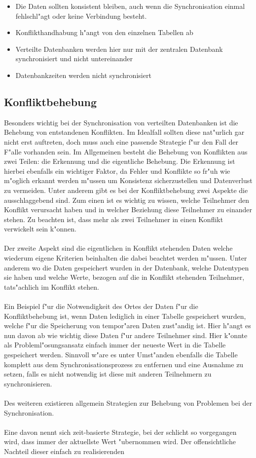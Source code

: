 \documentclass[a4paper,14pt]{scrreprt}
\begin{document}
\begin{itemize}
\item Die Daten sollten konsistent bleiben, auch wenn die Synchronisation einmal fehlschl"agt oder keine Verbindung besteht.
\item Konflikthandhabung h"angt von den einzelnen Tabellen ab
\item Verteilte Datenbanken werden hier nur mit der zentralen Datenbank synchronisiert und nicht untereinander
\item Datenbankzeiten werden nicht synchronisiert
\end{itemize}
\cite{diploBork}
\subsection{Konfliktbehebung}
Besonders wichtig bei der Synchronisation von verteilten Datenbanken ist die Behebung von entstandenen Konflikten. Im Idealfall sollten diese nat"urlich gar nicht erst auftreten, doch muss auch eine passende Strategie f"ur den Fall der F"alle vorhanden sein. Im Allgemeinen besteht die Behebung von Konflikten aus zwei Teilen: die Erkennung und die eigentliche Behebung. Die Erkennung ist hierbei ebenfalls ein wichtiger Faktor, da Fehler und Konflikte so fr"uh wie m"oglich erkannt werden m"ussen um Konsistenz sicherzustellen und Datenverlust zu vermeiden. Unter anderem gibt es bei der Konfliktbehebung zwei Aspekte die ausschlaggebend sind. Zum einen ist es wichtig zu wissen, welche Teilnehmer den Konflikt verursacht haben und in welcher Beziehung diese Teilnehmer zu einander stehen. Zu beachten ist, dass mehr als zwei Teilnehmer in einen Konflikt verwickelt sein k"onnen.\\\\Der zweite Aspekt sind die eigentlichen in Konflikt stehenden Daten welche wiederum eigene Kriterien beinhalten die dabei beachtet werden m"ussen. Unter anderem wo die Daten gespeichert wurden in der Datenbank, welche Datentypen sie haben und welche Werte, bezogen auf die in Konflikt stehenden Teilnehmer, tats"achlich im Konflikt stehen.\\\\Ein Beispiel f"ur die Notwendigkeit des Ortes der Daten f"ur die Konfliktbehebung ist, wenn Daten lediglich in einer Tabelle gespeichert wurden, welche f"ur die Speicherung von tempor"aren Daten zust"andig ist. Hier h"angt es nun davon ab wie wichtig diese Daten f"ur andere Teilnehmer sind. Hier k"onnte als Probleml"osungsansatz einfach immer der neueste Wert in die Tabelle gespeichert werden. Sinnvoll w"are es unter Umst"anden ebenfalls die Tabelle komplett aus dem Synchronisationsprozess zu entfernen und eine Ausnahme zu setzen, falls es nicht notwendig ist diese mit anderen Teilnehmern zu synchronisieren.\\\\Des weiteren existieren allgemein Strategien zur Behebung von Problemen bei der Synchronisation. \\\\Eine davon nennt sich zeit-basierte Strategie, bei der schlicht so vorgegangen wird, dass immer der aktuellste Wert "ubernommen wird. Der offensichtliche Nachteil dieser einfach zu realisierenden 
\end{document}
